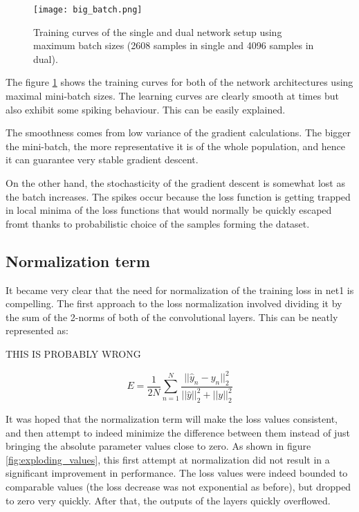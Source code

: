 \documentclass[a4paper, 11pt]{article}
\numberwithin{equation}{section}
\begin{document}
	\begin{figure}[!h]
		\centering
		\texttt{[image: big\_batch.png]}
		\caption{\label{fig:big_batch}{Training curves of the single and dual network setup using maximum batch sizes (2608 samples in single and 4096 samples in dual).}}
	\end{figure}

	The figure \ref{fig:big_batch} shows the training curves for both of the network architectures using maximal mini-batch sizes. The learning curves are clearly smooth at times but also exhibit some spiking behaviour. This can be easily explained.
	
	The smoothness comes from low variance of the gradient calculations. The bigger the mini-batch, the more representative it is of the whole population, and hence it can guarantee very stable gradient descent.
	
	On the other hand, the stochasticity of the gradient descent is somewhat lost as the batch increases. The spikes occur because the loss function is getting trapped in local minima of the loss functions that would normally be quickly escaped fromt thanks to probabilistic choice of the samples forming the dataset.
	
	\subsection{Normalization term }
	
	It became very clear that the need for normalization of the training loss in net1 is compelling. The first approach to the loss normalization involved dividing it by the sum of the 2-norms of both of the convolutional layers. This can be neatly represented as:
	
	THIS IS PROBABLY WRONG
	
	\begin{equation}
		E=\frac{1}{2N} \sum_{n=1}^{N} \frac{||\hat{y}_n-y_n||^2_2}{||\hat{y}||^2_2+||y||^2_2} 
	\end{equation}
	
	It was hoped that the normalization term will make the loss values consistent, and then attempt to indeed minimize the difference between them instead of just bringing the absolute parameter values close to zero. As shown in figure \ref{fig:exploding_values}, this first attempt at normalization did not result in a significant improvement in performance. The loss values were indeed bounded to comparable values (the loss decrease was not exponential as before), but dropped to zero very quickly. After that, the outputs of the layers quickly overflowed. \\
	
\end{document}
